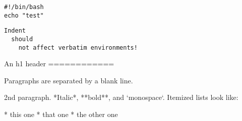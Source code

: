 \begin{verbatim}
#!/bin/bash
echo "test"
\end{verbatim}

\begin{lstlisting}
Indent
  should
    not affect verbatim environments!
\end{lstlisting}

\begin{markdown}
An h1 header
============

Paragraphs are separated by a blank line.

2nd paragraph.
*Italic*, **bold**, and `monospace`.
Itemized lists look like:

* this one
* that one
* the other one
\end{markdown}
